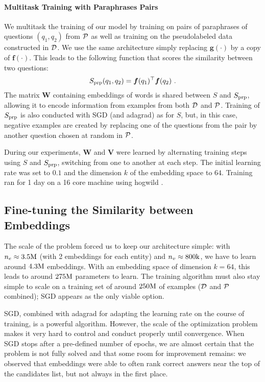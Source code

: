\documentclass[runningheads,a4paper]{llncs}
\newcommand{\bbW}{\boldsymbol{W}}
\newcommand{\bbV}{\boldsymbol{V}}
\newcommand{\bbg}{\boldsymbol{g}}
\newcommand{\bbf}{\boldsymbol{f}}
\newcommand{\Spr}[2]{S_{{\rm prp}}(#1,#2)}
\newcommand{\Sprv}{S_{{\rm prp}}}
\begin{document}
\paragraph{Multitask Training with Paraphrases Pairs}
We multitask the training of our model by training on pairs of paraphrases of questions $(q_1, q_2)$ from ${\cal P}$ as well as training on the pseudolabeled data constructed in ${\cal D}$.
We use the same architecture simply replacing $\bbg(\cdot)$ by a copy of $\bbf(\cdot)$. 
This leads to the following function that scores the similarity between two questions:
$$
\Spr{q_1}{q_2} = \bbf(q_1)^\top \bbf(q_2)~.
$$
The matrix $\bbW$ containing embeddings of words is shared between $S$ and $\Sprv$, allowing it to encode information from examples from both ${\cal D}$ and ${\cal P}$.
Training of $\Sprv$ is also conducted with SGD (and {\sc adagrad}) as for $S$, but, in this case, negative examples are created by replacing one of the questions from the pair by another question chosen at random in ${\cal P}$.

During our experiments, $\bbW$ and $\bbV$ were learned by alternating training steps using $S$ and $\Sprv$, switching from one to another at each step.
The initial learning rate was set to $0.1$ and the dimension $k$ of the embedding space to $64$. Training ran for 1 day on a 16 core machine using {\sc hogwild} \cite{recht2011hogwild}.



\subsection{Fine-tuning the Similarity between Embeddings}

The scale of the problem forced us to keep our architecture simple: with $n_e\approx 3.5{\rm M}$ (with 2 embeddings for each entity) and $n_v \approx 800{\rm k}$, we have to learn around $4.3{\rm M}$ embeddings.
With an embedding space of dimension $k=64$, this leads to around $275{\rm M}$ parameters to learn.
The training algorithm must also stay simple to scale on a training set of around $250{\rm M}$ of examples (${\cal D}$ and ${\cal P}$ combined); SGD  appears as the only viable option.

SGD, combined with {\sc adagrad} for adapting the learning rate on the course of training, is a powerful algorithm.
However, the scale of the optimization problem makes it very hard to control and conduct properly until convergence.
When SGD stops after a pre-defined number of epochs, we are almost certain that the problem is not fully solved and that some room for improvement remains: we observed that embeddings were able to often rank correct answers near the top of the candidates list, but not always in the first place.
\end{document}
